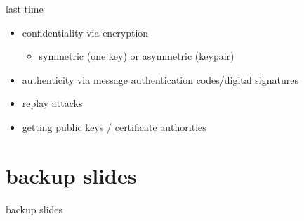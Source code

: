 \date{}
\title{}
\date{}
\usepackage{pgfplots}
\pgfplotsset{compat=1.16}

\begin{frame}
    \titlepage
\end{frame}

\begin{frame}{last time}
    \begin{itemize}
    \item confidentiality via encryption
        \begin{itemize}
        \item symmetric (one key) or asymmetric (keypair)
        \end{itemize}
    \item authenticity via message authentication codes/digital signatures
    \item replay attacks
    \item getting public keys / certificate authorities
    \end{itemize}
\end{frame}


\usetikzlibrary{circuits.logic.mux}







\section{backup slides}
\begin{frame}{backup slides}
\end{frame}


